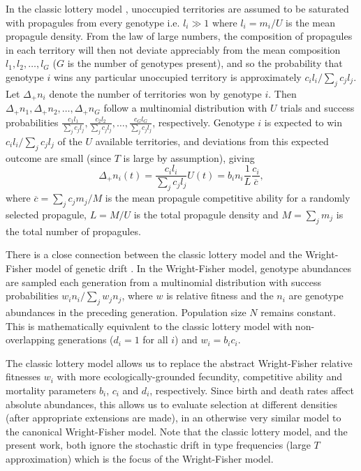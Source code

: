 \documentclass[11pt]{article}
\begin{document}
In the classic lottery model \citep{chesson_1981}, unoccupied territories are assumed to be saturated with propagules from every genotype i.e. $l_i\gg 1$ where $l_i=m_i/U$ is the mean propagule density. From the law of large numbers, the composition of propagules in each territory will then not deviate appreciably from the mean composition $l_1,l_2,\ldots,l_G$ ($G$ is the number of genotypes present), and so the probability that genotype $i$ wins any particular unoccupied territory is approximately $c_i l_i/\sum_j c_j l_j$. Let $\Delta_+ n_i$ denote the number of territories won by genotype $i$. Then $\Delta_+ n_1,\Delta_+ n_2,\ldots,\Delta_+ n_G$ follow a multinomial distribution with $U$ trials and success probabilities $\frac{c_1 l_1}{\sum_j c_j l_j},\frac{c_2 l_2}{\sum_j c_j l_j},\ldots,\frac{c_G l_G}{\sum_j c_j l_j}$, respectively. Genotype $i$ is expected to win $c_i l_i/\sum_j c_j l_j$ of the $U$ available territories, and deviations from this expected outcome are small (since $T$ is large by assumption), giving 
\begin{equation}
\Delta_+ n_i(t)=\frac{c_i l_i}{\sum_j c_j l_j}U(t)=b_i n_i\frac{1}{L}\frac{c_i}{\overline{c}}, \label{eq:lottery}
\end{equation}
where $\overline{c}=\sum_j c_j m_j/M$ is the mean propagule competitive ability for a randomly selected propagule, $L=M/U$ is the total propagule density and $M=\sum_j m_j$ is the total number of propagules. 

There is a close connection between the classic lottery model and the Wright-Fisher model of genetic drift \citep{svardal_2015}. In the Wright-Fisher model, genotype abundances are sampled each generation from a multinomial distribution with success probabilities $w_i n_i/\sum_j w_j n_j$, where $w$ is relative fitness and the $n_i$ are  genotype abundances in the preceding generation. Population size $N$ remains constant. This is mathematically equivalent to the classic lottery model with non-overlapping generations ($d_i=1$ for all $i$) and $w_i=b_i c_i$. 

The classic lottery model allows us to replace the abstract Wright-Fisher relative fitnesses $w_i$ with more ecologically-grounded fecundity, competitive ability and mortality parameters $b_i$, $c_i$ and $d_i$, respectively. Since birth and death rates affect absolute abundances, this allows us to evaluate selection at different densities (after appropriate extensions are made), in an otherwise very similar model to the canonical Wright-Fisher model. Note that the classic lottery model, and the present work, both ignore the stochastic drift in type frequencies (large $T$ approximation) which is the focus of the Wright-Fisher model. 
\end{document}
